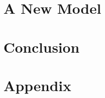 \documentclass[12pt,twoside]{report}
\begin{document}
\chapter{A New Model}
\label{ch:sea}


\chapter{Conclusion}
\label{ch:conclusion}


\appendix
\chapter{Appendix}
\label{ch:appendix}


\printbibliography
\end{document}
